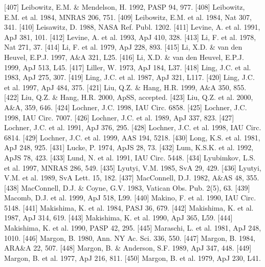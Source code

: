 \documentclass{aa}
\begin{document}
\begin{thebibliography}{}
\bibitem[]{}[407] Leibowitz, E.M. \& Mendelson, H. 1992, PASP 94, 977.
\bibitem[]{}[408] Leibowitz, E.M. et al. 1984, MNRAS 206, 751.
\bibitem[]{}[409] Leibowitz, E.M. et al. 1984, Nat 307, 341.
\bibitem[]{}[410] Leisawitz, D. 1988, NASA Ref. Publ. 1202.
\bibitem[]{}[411] Levine, A. et al. 1991, ApJ 381, 101.
\bibitem[]{}[412] Levine, A. et al. 1993, ApJ 410, 328.
\bibitem[]{}[413] Li, F. et al. 1978, Nat 271, 37.
\bibitem[]{}[414] Li, F. et al. 1979, ApJ 228, 893.
\bibitem[]{}[415] Li, X.D. \& van den Heuvel, E.P.J. 1997, A\&A 321, L25.
\bibitem[]{}[416] Li, X.D. \& van den Heuvel, E.P.J. 1999, ApJ 513, L45.
\bibitem[]{}[417] Liller, W. 1973, ApJ 184, L37.
\bibitem[]{}[418] Ling, J.C. et al. 1983, ApJ 275, 307.
\bibitem[]{}[419] Ling, J.C. et al. 1987, ApJ 321, L117.
\bibitem[]{}[420] Ling, J.C. et al. 1997, ApJ 484, 375.
\bibitem[]{}[421] Liu, Q.Z. \& Hang, H.R. 1999, A\&A 350, 855.
\bibitem[]{}[422] Liu, Q.Z. \& Hang, H.R. 2000, ApSS, accepted.
\bibitem[]{}[423] Liu, Q.Z. et al. 2000, A\&A, 359, 646.
\bibitem[]{}[424] Lochner, J.C. 1998, IAU Circ. 6858. 
\bibitem[]{}[425] Lochner, J.C. 1998, IAU Circ. 7007.
\bibitem[]{}[426] Lochner, J.C. et al. 1989, ApJ 337, 823.
\bibitem[]{}[427] Lochner, J.C. et al. 1991, ApJ 376, 295.
\bibitem[]{}[428] Lochner, J.C. et al. 1998, IAU Circ. 6814.
\bibitem[]{}[429] Lochner, J.C. et al. 1999, AAS 194, 5218.
\bibitem[]{}[430] Long, K.S. et al. 1981, ApJ 248, 925.
\bibitem[]{}[431] Lucke, P. 1974, ApJS 28, 73.
\bibitem[]{}[432] Lum, K.S.K. et al. 1992, ApJS 78, 423.
\bibitem[]{}[433] Lund, N. et al. 1991, IAU Circ. 5448.
\bibitem[]{}[434] Lyubimkov, L.S. et al. 1997, MNRAS 286, 549.
\bibitem[]{}[435] Lyutyi, V.M. 1985, SvA 29, 429.
\bibitem[]{}[436] Lyutyi, V.M. et al. 1989, SvA Lett. 15, 182.
\bibitem[]{}[437] MacConnell, D.J. 1982, A\&AS 48, 355.
\bibitem[]{}[438] MacConnell, D.J. \& Coyne, G.V. 1983, Vatican Obs. Pub. 2(5), 63.
\bibitem[]{}[439] Macomb, D.J. et al. 1999, ApJ 518, L99.
\bibitem[]{}[440] Makino, F. et al. 1990, IAU Circ. 5148.
\bibitem[]{}[441] Makishima, K. et al. 1984, PASJ 36, 679.
\bibitem[]{}[442] Makishima, K. et al. 1987, ApJ 314, 619.
\bibitem[]{}[443] Makishima, K. et al. 1990, ApJ 365, L59.
\bibitem[]{}[444] Makishima, K. et al. 1990, PASP 42, 295.
\bibitem[]{}[445] Maraschi, L. et al. 1981, ApJ 248, 1010.
\bibitem[]{}[446] Margon, B. 1980, Ann. NY Ac. Sci. 336, 550.
\bibitem[]{}[447] Margon, B. 1984, ARA\&A 22, 507.
\bibitem[]{}[448] Margon, B. \& Anderson, S.F. 1989, ApJ 347, 448.
\bibitem[]{}[449] Margon, B. et al. 1977, ApJ 216, 811.
\bibitem[]{}[450] Margon, B. et al. 1979, ApJ 230, L41.

\end{thebibliography}
\end{document}
